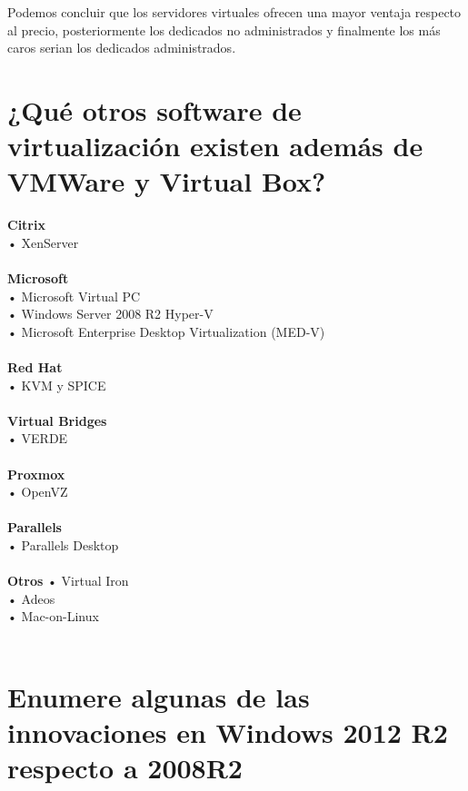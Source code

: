 Podemos concluir que los servidores virtuales ofrecen una mayor ventaja respecto al precio, posteriormente los dedicados no administrados y finalmente los más caros serian los dedicados administrados.\\
\clearpage

\section{¿Qué otros software de virtualización existen además de VMWare y Virtual Box? \cite{04p31}}

\textbf{Citrix}
\\
• XenServer\\
\\
\textbf{Microsoft}\\
• Microsoft Virtual PC\\
• Windows Server 2008 R2 Hyper-V\\
• Microsoft Enterprise Desktop Virtualization (MED-V)\\
\\
\textbf{Red Hat}\\
• KVM y SPICE\\
\\
\textbf{Virtual Bridges}\\
• VERDE\\
\\
\textbf{Proxmox}\\
• OpenVZ \\
\\
\textbf{Parallels}\\
• Parallels Desktop\\
\\
\textbf{Otros}
• Virtual Iron\\
• Adeos\\
• Mac-on-Linux\\
\\

\section{Enumere algunas de las innovaciones en Windows 2012 R2 respecto a 2008R2 \cite{05p41}}

